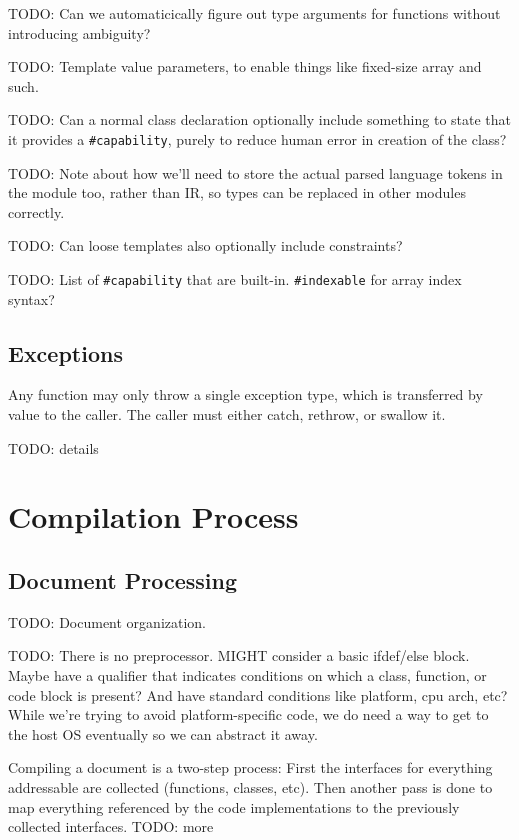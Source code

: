 \documentclass{article}
\newcommand{\code}[1]{\colorbox{light-gray}{\texttt{#1}}}
\begin{document}
TODO: Can we automaticically figure out type arguments for functions without introducing ambiguity?

TODO: Template value parameters, to enable things like fixed-size array and such.

TODO: Can a normal class declaration optionally include something to state that it provides a \code{\#capability}, purely to reduce human error in creation of the class?

TODO: Note about how we'll need to store the actual parsed language tokens in the module too, rather than IR, so types can be replaced in other modules correctly.

TODO: Can loose templates also optionally include constraints?

TODO: List of \code{\#capability} that are built-in.  \code{\#indexable} for array index syntax?

\subsection{Exceptions}
Any function may only throw a single exception type, which is transferred by value to the caller.  The caller must either catch, rethrow, or swallow it.

TODO: details

\newpage

\section{Compilation Process}

\subsection{Document Processing}

TODO: Document organization.

TODO: There is no preprocessor.  MIGHT consider a basic ifdef/else block.  Maybe have a qualifier that indicates conditions on which a class, function, or code block is present?  And have standard conditions like platform, cpu arch, etc?  While we're trying to avoid platform-specific code, we do need a way to get to the host OS eventually so we can abstract it away.

Compiling a document is a two-step process: First the interfaces for everything addressable are collected (functions, classes, etc).  Then another pass is done to map everything referenced by the code implementations to the previously collected interfaces.  TODO: more
\end{document}

